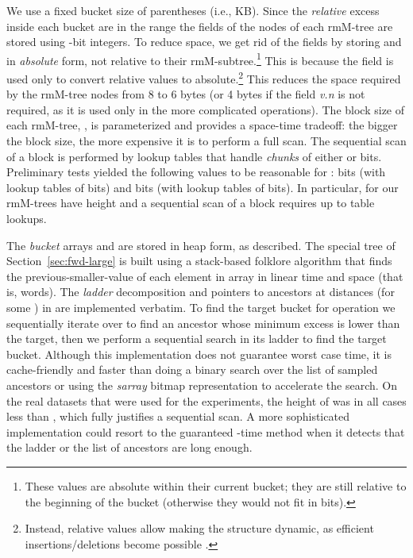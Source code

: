 \documentclass[11pt]{article}
\newcommand{\0}{\mathit{0}}
\newcommand{\1}{\mathit{1}}
\begin{document}
We use a fixed bucket size of  parentheses (i.e., KB).
Since the \emph{relative} excess inside each bucket are in the range 
 the fields of the nodes of each rmM-tree are stored 
using -bit integers. To reduce space, we get rid of the  fields by 
storing  and  in \emph{absolute} form, not relative to 
their rmM-subtree.\footnote{These values are absolute within their current 
bucket; they are still relative to the beginning of the bucket (otherwise they 
would not fit in  bits).} This is because the field  is used only to 
convert relative values to
absolute.\footnote{Instead, relative values allow making the structure
dynamic, as efficient insertions/deletions become possible \cite{NS14}.}
This reduces the space required by the rmM-tree nodes from 8
to 6 bytes (or 4 bytes if the field \emph{v.n} is not required, as it is
used only in the more complicated operations). The block size of each
rmM-tree, , is parameterized and provides a space-time tradeoff:  the bigger
the block size, the more expensive it is to perform a full scan.  The sequential
scan of a block is performed by lookup tables that handle \emph{chunks} of
either  or  bits. Preliminary tests yielded the following values to be 
reasonable for :  bits (with lookup tables of  bits) and
 bits (with lookup tables of  bits).  In particular, for 
our rmM-trees have height  and a sequential scan of a
block requires up to  table lookups.

The \emph{bucket} arrays  and  are stored in heap form, as 
described. The special tree  of Section~\ref{sec:fwd-large} is built
using a stack-based folklore algorithm that finds the previous-smaller-value
of each element in array  in linear time and space (that is, 
words).  The \emph{ladder} decomposition and pointers to ancestors at
distances  (for some ) in  are implemented verbatim.  To find the
target bucket for operation  we sequentially iterate over
 to find an ancestor whose minimum excess is lower than the
target, then we perform a sequential search in its ladder to find the target
bucket.  Although this implementation does not guarantee 
worst case time, it is cache-friendly and faster than doing a binary search over
the list of sampled ancestors or using the \emph{sarray} bitmap representation
to accelerate the search. On the real datasets that were used for
the experiments, the height of  was in all cases less than , which
fully justifies a sequential scan. A more
sophisticated implementation could resort to the guaranteed -time
method when it detects that the ladder or the list of ancestors are long enough.
\end{document}
